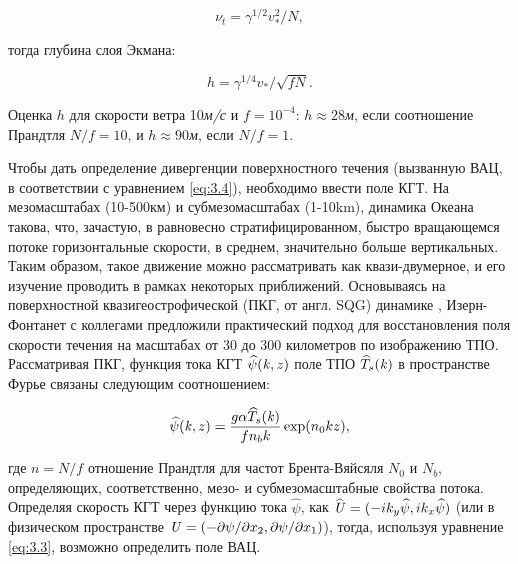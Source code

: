 {\begin{equation} \label{eq:3.6} \nu _{t} =\gamma ^{1/2} v_{*}^{2} /N,  \end{equation}



\noindent тогда глубина слоя Экмана:



\begin{equation} \label{eq:3.7} h=\gamma ^{1/4} v_{*} /\sqrt{fN} .  \end{equation} 



Оценка $h$ для скорости ветра 10\textit{м/с} и $f=10^{-4} $: $h\approx 28$\textit{м}, если соотношение Прандтля $N/f=10$, и $h\approx 90$\textit{м}, если $N/f=1$.

Чтобы дать определение дивергенции поверхностного течения (вызванную ВАЦ, в соответствии с уравнением \eqref{eq:3.4}), необходимо ввести поле КГТ. На мезомасштабах (10-500км) и субмезомасштабах (1-10km), динамика Океана такова, что, зачастую, в равновесно стратифицированном, быстро вращающемся потоке горизонтальные скорости, в среднем, значительно больше вертикальных. Таким образом, такое движение можно рассматривать как квази-двумерное, и его изучение проводить в рамках некоторых приближений. Основываясь на поверхностной квазигеострофической (ПКГ, от англ. SQG) динамике \citep{Held1995,Lapeyre2006}, Изерн-Фонтанет с коллегами \citep{Isern-Fontanet2008} предложили практический подход для восстановления поля скорости течения на масштабах от 30 до 300 километров по изображению ТПО. Рассматривая ПКГ, функция тока КГТ $\widehat{\psi }({\it k},z)$ поле ТПО $\widehat{T}_{s} ({\it k})$ в пространстве Фурье связаны следующим соотношением:



\begin{equation} \label{eq:3.8} \widehat{\psi }({\it k},z)=\frac{g\alpha \widehat{T}_{s} ({\it k})}{fn_{b} k} \exp (n_{0} kz),  \end{equation} 



\noindent где $n=N/f$ отношение Прандтля для частот Брента-Вяйсяля $N_{0} $ и $N_{b} $, определяющих, соответственно, мезо- и субмезомасштабные свойства потока. Определяя скорость КГТ через функцию тока $\widehat{\psi }$, как $\widehat{{\it U}}=(-ik_{y} \widehat{\psi },ik_{x} \widehat{\psi })$ (или в физическом пространстве ${\it U}=(-\partial \psi /\partial x_{2} ,\partial \psi /\partial x_{1} )$), тогда, используя уравнение \eqref{eq:3.3}, возможно определить поле ВАЦ. 

}
